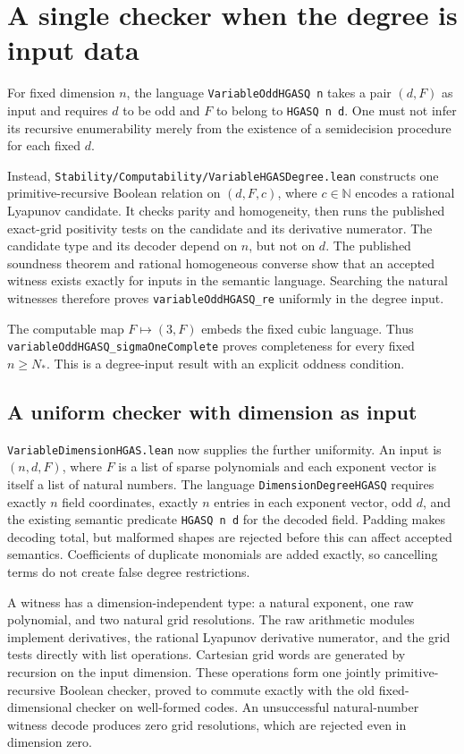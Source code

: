 \documentclass[11pt]{article}
\newcommand{\N}{\mathbb N}
\newcommand{\code}[1]{{\small\nolinkurl{#1}}}
\begin{document}
\section{A single checker when the degree is input data}

For fixed dimension $n$, the language \code{VariableOddHGASQ n} takes a pair
$(d,F)$ as input and requires $d$ to be odd and $F$ to belong to
\code{HGASQ n d}. One must not infer its recursive enumerability merely
from the existence of a semidecision procedure for each fixed $d$.

Instead, \code{Stability/Computability/VariableHGASDegree.lean} constructs
one primitive-recursive Boolean relation on $(d,F,c)$, where $c\in\N$
encodes a rational Lyapunov candidate. It checks parity and homogeneity,
then runs the published exact-grid positivity tests on the candidate and
its derivative numerator. The candidate type and its decoder depend on
$n$, but not on $d$. The published soundness theorem and rational homogeneous
converse show that an accepted witness exists exactly for inputs in the
semantic language. Searching the natural witnesses therefore proves
\code{variableOddHGASQ_re} uniformly in the degree input.

The computable map $F\mapsto(3,F)$ embeds the fixed cubic language. Thus
\code{variableOddHGASQ_sigmaOneComplete} proves completeness for every
fixed $n\ge N_*$. This is a degree-input result with an explicit oddness
condition.

\subsection{A uniform checker with dimension as input}

\code{VariableDimensionHGAS.lean} now supplies the further uniformity.
An input is $(n,d,F)$, where $F$ is a list of sparse polynomials and each
exponent vector is itself a list of natural numbers. The language
\code{DimensionDegreeHGASQ} requires exactly $n$ field coordinates,
exactly $n$ entries in each exponent vector, odd $d$, and the existing
semantic predicate \code{HGASQ n d} for the decoded field. Padding makes
decoding total, but malformed shapes are rejected before this can affect
accepted semantics. Coefficients of duplicate monomials are added exactly,
so cancelling terms do not create false degree restrictions.

A witness has a dimension-independent type: a natural exponent, one raw
polynomial, and two natural grid resolutions. The raw arithmetic modules
implement derivatives, the rational Lyapunov derivative numerator, and
the grid tests directly with list operations. Cartesian grid words are
generated by recursion on the input dimension. These operations form one
jointly primitive-recursive Boolean checker, proved to commute exactly
with the old fixed-dimensional checker on well-formed codes. An unsuccessful
natural-number witness decode produces zero grid resolutions, which are
rejected even in dimension zero.
\end{document}
